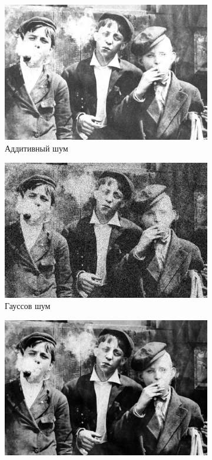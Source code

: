 \begin{figure}[ht]
\begin{subfigure}[b]{0.5\linewidth}
      \includegraphics[width=0.95\linewidth]{../Wiener_Filter/Wiener_Additive_noise_(k=3).jpg} 
      \caption{Аддитивный шум} 
      \label{weiner_3:c} 
      \vspace{4ex}
    \end{subfigure}%
    \begin{subfigure}[b]{0.5\linewidth}
      \centering
      \includegraphics[width=0.95\linewidth]{../Wiener_Filter/Wiener_Gaussian_noise_(k=3).jpg} 
      \caption{Гауссов шум} 
      \label{weiner_3:d} 
      \vspace{4ex}
    \end{subfigure}
    \begin{subfigure}[b]{0.5\linewidth}
      \centering
      \includegraphics[width=0.95\linewidth]{../Wiener_Filter/Wiener_Poisson_noise_(k=3).jpg} 

\end{subfigure}
\end{figure}
